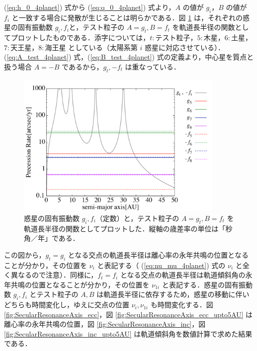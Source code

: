 \documentclass[11pt,a4paper,oneside,onecolumn]{jreport}
\begin{document}
(\ref{eq:h_0_4planet}) 式から (\ref{eq:q_0_4planet}) 式より，$A$ の値が $g_i$，$B$ の値が $f_i$ と一致する場合に発散が生じることは明らかである．図 \ref{fig:PrecessionRate} は，それぞれの惑星の固有振動数 $g_i, f_i$と，テスト粒子の $A = g_t, B = f_t$ を軌道長半径の関数としてプロットしたものである．添字については，$t : テスト粒子$，$5 : 木星$，$6 : 土星$，$7 : 天王星$，$8 : 海王星$ としている（太陽系第 $i$ 惑星に対応させている）．(\ref{eq:A_test_4planet}) 式，(\ref{eq:B_test_4planet}) 式の定義より，中心星を質点と扱う場合 $A = - B$ であるから，$g_t, - f_t$ は重なっている．
\begin{figure}[H]
\centering
\includegraphics[width=10cm]{./image/PrecessionRate_logAB.pdf}
\caption{惑星の固有振動数 $g_i, f_i$（定数）と，テスト粒子の $A = g_t, B = f_t$ を軌道長半径の関数としてプロットした．縦軸の歳差率の単位は「秒角／年」である．\label{fig:PrecessionRate}}
\end{figure}
この図から，$g_t = g_i$ となる交点の軌道長半径は離心率の永年共鳴の位置となることが分かり，その位置を $\nu_i$ と表記する（ (\ref{eq:nu_mu_4planet}) 式の $\nu_i$ と全く異なるので注意）．同様に，$f_t = f_i$ となる交点の軌道長半径は軌道傾斜角の永年共鳴の位置となることが分かり，その位置を $\nu_{1i}$ と表記する．惑星の固有振動数 $g_i, f_i$ とテスト粒子の $A, B$ は軌道長半径に依存するため，惑星の移動に伴いどちらも時間変化し，ゆえに交点の位置 $\nu_i, \nu_{1i}$ も時間変化する．図 \ref{fig:SecularResonanceAxis_ecc}，図 \ref{fig:SecularResonanceAxis_ecc_upto5AU} は離心率の永年共鳴の位置，図 \ref{fig:SecularResonanceAxis_inc}，図 \ref{fig:SecularResonanceAxis_inc_upto5AU} は軌道傾斜角を数値計算で求めた結果である．
\end{document}
